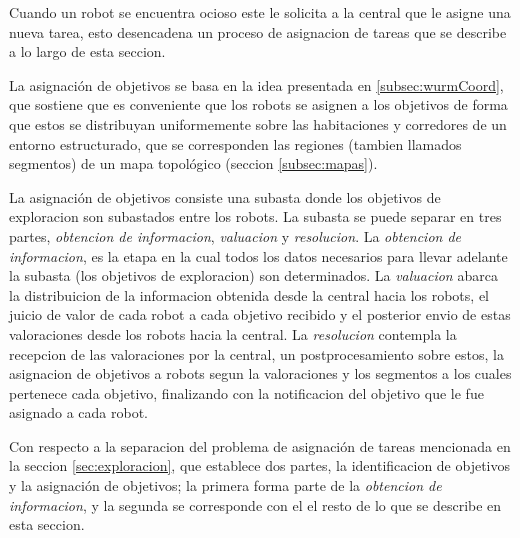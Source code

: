 Cuando un robot se encuentra ocioso este le solicita a la central que le asigne
una nueva tarea, esto desencadena un proceso de asignacion de
tareas que se describe a lo largo de esta seccion.

La asignación de objetivos se basa en la idea presentada en
\ref{subsec:wurmCoord}, que sostiene que es conveniente que los robots se
asignen a los objetivos de forma que estos se distribuyan uniformemente sobre
las habitaciones y corredores de un entorno estructurado, que se corresponden
las regiones (tambien llamados segmentos) de un mapa topológico (seccion
\ref{subsec:mapas}).

La asignación de objetivos consiste una subasta donde los objetivos de
exploracion son subastados entre los robots. La subasta se puede separar en
tres partes, \emph{obtencion de informacion}, \emph{valuacion} y
\emph{resolucion}. La \emph{obtencion de informacion}, es la etapa en la cual
todos los datos necesarios para llevar adelante la subasta (los objetivos de
exploracion) son determinados. La \emph{valuacion} abarca la distribuicion de
la informacion obtenida desde la central hacia los robots, el juicio de valor
de cada robot a cada objetivo recibido y el posterior envio de estas
valoraciones desde los robots hacia la central. La \emph{resolucion} contempla
la recepcion de las valoraciones por la central, un postprocesamiento sobre
estos, la asignacion de objetivos a robots segun la valoraciones y los
segmentos a los cuales pertenece cada objetivo, finalizando con la notificacion
del objetivo que le fue asignado a cada robot.

Con respecto a la separacion del problema de asignación de tareas mencionada en
la seccion \ref{sec:exploracion}, que establece dos partes, la identificacion
de objetivos y la asignación de objetivos; la primera forma parte de la
\emph{obtencion de informacion}, y la segunda se corresponde con el el resto de
lo que se describe en esta seccion.



